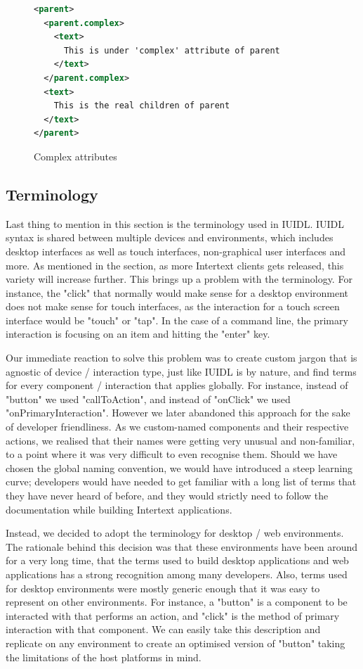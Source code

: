 \begin{figure}
\begin{minipage}{\linewidth}
\begin{lstlisting}[language=xml]
<parent>
  <parent.complex>
    <text>
      This is under 'complex' attribute of parent
    </text>
  </parent.complex>
  <text>
    This is the real children of parent
  </text>
</parent>
\end{lstlisting}
\end{minipage}
\caption{Complex attributes}%
\label{fig:complex_attributes}%
\end{figure}


\subsection{Terminology}

Last thing to mention in this section is the terminology used in IUIDL. IUIDL syntax is shared between multiple devices and environments, which includes desktop interfaces as well as touch interfaces, non-graphical user interfaces and more. As mentioned in the  section, as more Intertext clients gets released, this variety will increase further. This brings up a problem with the terminology. For instance, the "click" that normally would make sense for a desktop environment does not make sense for touch interfaces, as the interaction for a touch screen interface would be "touch" or "tap". In the case of a command line, the primary interaction is focusing on an item and hitting the "enter" key. 

Our immediate reaction to solve this problem was to create custom jargon that is agnostic of device / interaction type, just like IUIDL is by nature, and find terms for every component / interaction that applies globally. For instance, instead of "button" we used "callToAction", and instead of "onClick" we used "onPrimaryInteraction". However we later abandoned this approach for the sake of developer friendliness. As we custom-named components and their respective actions, we realised that their names were getting very unusual and non-familiar, to a point where it was very difficult to even recognise them. Should we have chosen the global naming convention, we would have introduced a steep learning curve; developers would have needed to get familiar with a long list of terms that they have never heard of before, and they would strictly need to follow the documentation while building Intertext applications.

Instead, we decided to adopt the terminology for desktop / web environments. The rationale behind this decision was that these environments have been around for a very long time, that the terms used to build desktop applications and web applications has a strong recognition among many developers. Also, terms used for desktop environments were mostly generic enough that it was easy to represent on other environments. For instance, a "button" is a component to be interacted with that performs an action, and "click" is the method of primary interaction with that component. We can easily take this description and replicate on any environment to create an optimised version of "button" taking the limitations of the host platforms in mind.